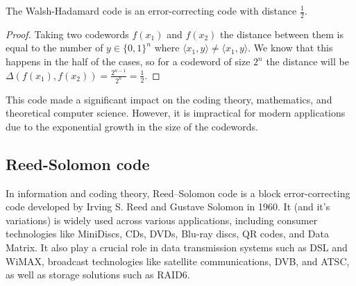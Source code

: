 \documentclass[../lecture-notes.tex]{subfiles}
\begin{document}
\begin{lemma}
The Walsh-Hadamard code is an error-correcting code with distance $\frac{1}{2}$.
\end{lemma}
\begin{proof}
Taking two codewords $f(x_1)$ and $f(x_2)$ the distance between them is equal to the number of $y \in \{0, 1\}^n$ where 
$\langle x_1, y \rangle \neq \langle x_1, y \rangle$. We know that this happens in the half of the cases, so for a 
codeword of size $2^n$ the distance will be $\Delta(f(x_1), f(x_2)) = \frac{2^{n-1}}{2^n} = \frac{1}{2}$.
\end{proof}    
This code made a significant impact on the coding theory, mathematics, and theoretical computer science. However, it is 
impractical for modern applications due to the exponential growth in the size of the codewords.


\subsection{Reed-Solomon code}
In information and coding theory, Reed–Solomon code is a block error-correcting code 
developed by Irving S. Reed and Gustave Solomon in 1960. It (and it's variations) is widely used across various 
applications, including consumer technologies like MiniDiscs, CDs, DVDs, Blu-ray discs, QR codes, and Data Matrix. It 
also play a crucial role in data transmission systems such as DSL and WiMAX, broadcast technologies like satellite 
communications, DVB, and ATSC, as well as storage solutions such as RAID6.
\end{document}
